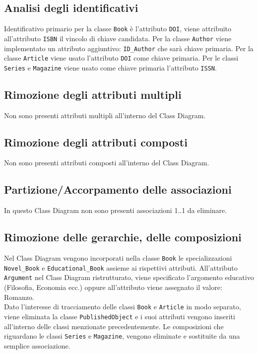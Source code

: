         \subsection{Analisi degli identificativi}
            Identificativo primario per la classe \texttt{Book} è l'attributo \texttt{DOI}, viene attribuito all'attributo \texttt{ISBN} il vincolo di chiave candidata. 
            Per la classe \texttt{Author} viene implementato un attributo aggiuntivo: \texttt{ID\_Author} che sarà chiave primaria.
			Per la classe \texttt{Article} viene usato l'attributo \texttt{DOI} come chiave primaria.
			Per le classi \texttt{Series} e \texttt{Magazine} viene usato come chiave primaria l'attributo \texttt{ISSN}.

        \subsection{Rimozione degli attributi multipli}
            Non sono presenti attributi multipli all'interno del Class Diagram.
        \subsection{Rimozione degli attributi composti}
        	Non sono presenti attributi composti all'interno del Class Diagram.
            
        \subsection{Partizione/Accorpamento delle associazioni}
       		In questo Class Diagram non sono presenti associazioni 1..1 da eliminare.
        \subsection{Rimozione delle gerarchie, delle composizioni}
    	 Nel Class Diagram vengono incorporati nella classe \texttt{Book} le specializzazioni \texttt{Novel\_Book} e \texttt{Educational\_Book} assieme ai rispettivi attributi. All'attributo \texttt{Argument} nel Class Diagram ristrutturato, viene specificato l'argomento educativo (Filosofia, Economia ecc.) oppure all'attributo viene assegnato il valore: Romanzo.\\
        Dato l'interesse di tracciamento delle classi \texttt{Book} e \texttt{Article} in modo separato, viene eliminata la classe \texttt{PublishedObject} e i suoi attributi vengono inseriti all'interno delle classi menzionate precedentemente.
        Le composizioni che riguardano le classi \texttt{Series} e \texttt{Magazine}, vengono eliminate e sostituite da una semplice associazione.
        \newpage
